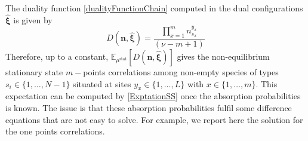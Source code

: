\documentclass[10pt]{article}
\numberwithin{equation}{section}
\numberwithin{equation}{subsection}
\begin{document}
The duality function \eqref{dualityFunctionChain} computed in the dual configurations $\bm{\hat{\xi}}$ is given by 
\begin{equation}
	D(\bm{n},\bm{\hat{\xi}})= \frac{\prod_{x=1}^{m}n_{s_{x}}^{y_{x}}}{(\nu-m+1)}
\end{equation}
Therefore, up to a constant, $\mathbb{E}_{\mu^{\text{stat}}}\left[D(\bm{n},\bm{\hat{\xi}})\right]$ gives the non-equilibrium stationary state $m-$points correlations among non-empty species of types $s_{i}\in\{1,\ldots,N-1\}$ situated at sites $y_{x}\in\{1,\ldots,L\}$ with $x\in \{1,\ldots,m\}$. This expectation can be computed by \eqref{ExptationSS} once the absorption probabilities is known. The issue is that these absorption probabilities fulfil some difference equations that are not easy to solve. For example, we report here the solution for the one points correlations. 
\end{document}
